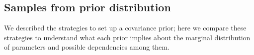 \documentclass[a4paper]{article}
\begin{document}
\subsection{Samples from  prior distribution} 
We described the strategies to set up a covariance prior; here we compare these strategies to understand what each prior implies about the marginal distribution of parameters and possible dependencies among them. 
\end{document}
